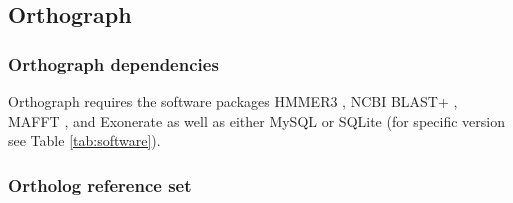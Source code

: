 \subsection{Orthograph}\label{orthograph}

\subsubsection{Orthograph dependencies}\label{orthograph-dependencies}

Orthograph requires the software packages HMMER3 \citep{Eddy2011}, NCBI
BLAST+ \citep{Camacho2009}, MAFFT \citep{Katoh2013}, and Exonerate
\citep{Slater2005} as well as either MySQL or SQLite (for specific
version see Table \ref{tab:software}).

\subsubsection{Ortholog reference set}\label{ortholog-reference-set}

